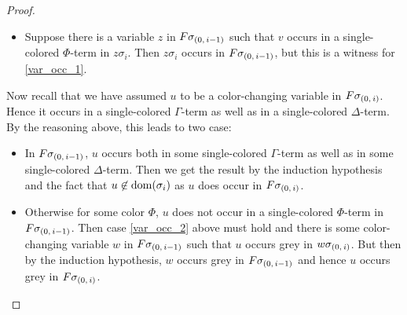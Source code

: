 \documentclass[,%
	draft=false,%
	numbers=noendperiod
	12pt,
	a4paper,
	oneside,%
	openany,
]{memoir}
\begin{document}
\begin{proof}
\begin{itemize}
	\item
		Suppose there is a variable $z$ in $F\sigma_{(0,\,i-1)}$ such that $v$ occurs in a single-colored $\Phi$-term in $z\sigma_i$.
		Then $z\sigma_i$ occurs in $F\sigma_{(0,\,i-1)}$, but this is a witness for \ref{var_occ_1}.
\end{itemize}

Now recall that we have assumed $u$ to be a color-changing variable in $F\sigma_{(0,\,i)}$.
Hence it occurs in a single-colored $\Gamma$-term as well as in a single-colored $\Delta$-term.
By the reasoning above, this leads to two case:
\begin{itemize}
	\item In $F\sigma_{(0,\,i-1)}$, $u$ occurs both in some single-colored $\Gamma$-term as well as in some single-colored $\Delta$-term.
		Then we get the result by the induction hypothesis and the fact that $u\not\in\operatorname{dom}(\sigma_i)$ as $u$ does occur in $F\sigma_{(0,\,i)}$.
	\item Otherwise for some color $\Phi$, $u$ does not occur in a single-colored $\Phi$-term in $F\sigma_{(0,\,i-1)}$.
		Then case \ref{var_occ_2} above must hold and there is some color-changing variable $w$ in $F\sigma_{(0,\,i-1)}$ such that $u$ occurs grey in $w\sigma_{(0,\,i)}$.
		But then by the induction hypothesis, $w$ occurs grey in $F\sigma_{(0,\,i-1)}$ and hence $u$ occurs grey in $F\sigma_{(0,\,i)}$.
		\qedhere
\end{itemize}


\end{proof}
\end{document}
